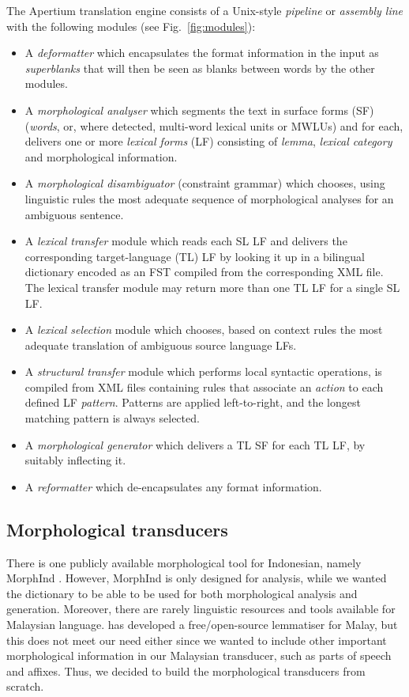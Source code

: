 \documentclass[10pt,a5paper,twoside]{article}
\begin{document}
The Apertium translation engine consists of a Unix-style \emph{pipeline} or
\emph{assembly line} with the following modules (see Fig.~\ref{fig:modules}):  
\begin{itemize}
\item A \emph{deformatter} which encapsulates the format information
 in the input as \emph{superblanks} that will then be seen
 as blanks between words by the other modules.
\item A \emph{morphological analyser} which segments the text in
  surface forms (SF) (\emph{words}, or, where detected, multi-word lexical
  units or MWLUs) and for each, delivers one or more \emph{lexical
    forms} (LF) consisting of \emph{lemma}, \emph{lexical category} and
  morphological information. 
\item A \emph{morphological disambiguator} (constraint grammar) which chooses, using linguistic rules
  the most adequate sequence of morphological analyses for an ambiguous sentence. 
\item A \emph{lexical transfer} module which reads each SL LF 
  and delivers the corresponding target-language (TL) LF
  by looking it up in a bilingual dictionary encoded as an FST
  compiled from the corresponding XML file. The lexical transfer module may
  return more than one TL LF for a single SL LF.
\item A \emph{lexical selection} module which chooses, based on context 
  rules the most adequate translation of ambiguous source language LFs.
\item A \emph{structural transfer} module which
    performs local syntactic operations, is compiled from XML files containing rules that 
    associate an \emph{action} to each defined LF \emph{pattern}. Patterns are applied left-to-right, and the 
    longest matching pattern is always selected.
\item A \emph{morphological generator} which delivers a TL SF
 for each TL LF, by suitably inflecting it. 
\item A \emph{reformatter} which de-encapsulates any format
  information.
\end{itemize}

\subsection{Morphological transducers}
There is one publicly available morphological tool for Indonesian, namely MorphInd \citep{larasati2011indonesian}. However, MorphInd is only designed for analysis, while we wanted the dictionary to be able to be used for both morphological analysis and generation. Moreover, there are rarely linguistic resources and tools available for Malaysian language. \citet{Baldwin06opensource} has developed a free/open-source lemmatiser for Malay, but this does not meet our need either since we wanted to include other important morphological information in our Malaysian transducer, such as parts of speech and affixes. Thus, we decided to build the morphological transducers from scratch.
\end{document}

